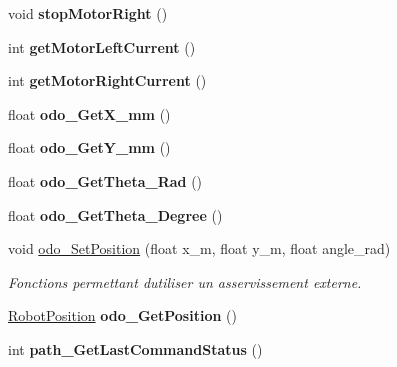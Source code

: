 \begin{DoxyCompactItemize}
void {\bfseries stop\+Motor\+Right} ()
\item 
\mbox{\label{classAsservDriver_ab93d873dc060cff42befa9e50a4a0b32}} 
int {\bfseries get\+Motor\+Left\+Current} ()
\item 
\mbox{\label{classAsservDriver_ace1b02fcab067c77ee71a134614ace50}} 
int {\bfseries get\+Motor\+Right\+Current} ()
\item 
\mbox{\label{classAsservDriver_a36553ad50ed9ef85fead94ac46077f65}} 
float {\bfseries odo\+\_\+\+Get\+X\+\_\+mm} ()
\item 
\mbox{\label{classAsservDriver_a69f277c28bf7b0f5642c446a2b8813b1}} 
float {\bfseries odo\+\_\+\+Get\+Y\+\_\+mm} ()
\item 
\mbox{\label{classAsservDriver_a2924f7f5b0cb429113655788437bffa7}} 
float {\bfseries odo\+\_\+\+Get\+Theta\+\_\+\+Rad} ()
\item 
\mbox{\label{classAsservDriver_af764eb227ab106c4dde5c4642cf42e6e}} 
float {\bfseries odo\+\_\+\+Get\+Theta\+\_\+\+Degree} ()
\item 
\mbox{\label{classAsservDriver_a036a5d7db2270ee5d388f0b6feaa253b}} 
void \hyperlink{classAsservDriver_a036a5d7db2270ee5d388f0b6feaa253b}{odo\+\_\+\+Set\+Position} (float x\+\_\+m, float y\+\_\+m, float angle\+\_\+rad)
\begin{DoxyCompactList}\small\item\em Fonctions permettant d\textquotesingle{}utiliser un asservissement externe. \end{DoxyCompactList}\item 
\mbox{\label{classAsservDriver_a0a62fbec28bfc5510eb75b6ad434baed}} 
\hyperlink{structRobotPosition}{Robot\+Position} {\bfseries odo\+\_\+\+Get\+Position} ()
\item 
\mbox{\label{classAsservDriver_ac4b8627777e76c145265a8e988852484}} 
int {\bfseries path\+\_\+\+Get\+Last\+Command\+Status} ()
\item 
\mbox{\label{classAsservDriver_affc4e315cdd03c826cea17114d02a19c}} 

\end{DoxyCompactItemize}
